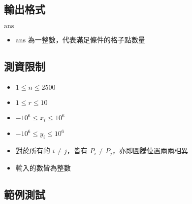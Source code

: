 \subsection{輸出格式}

\begin{format}
\f{
$\textrm{ans}$
}
\end{format}

\begin{itemize}
\tightlist
\item
  \begin{math}\textrm{ans}\end{math} 為一整數，代表滿足條件的格子點數量
\end{itemize}

\subsection{測資限制}

\begin{itemize}
\tightlist
\item
  \begin{math}1 \le n \le 2500\end{math}
\item
  \begin{math}1 \le r \le 10\end{math}
\item
  \begin{math}-10^6 \le x_i \le 10^6\end{math}
\item
  \begin{math}-10^6 \le y_i \le 10^6\end{math}
\item
  對於所有的 \begin{math}i\ne j\end{math}，皆有
  \begin{math}P_i\ne P_j\end{math}，亦即圖騰位置兩兩相異
\item
  輸入的數皆為整數
\end{itemize}

\subsection{範例測試}

\begin{example}
%
\end{example}

